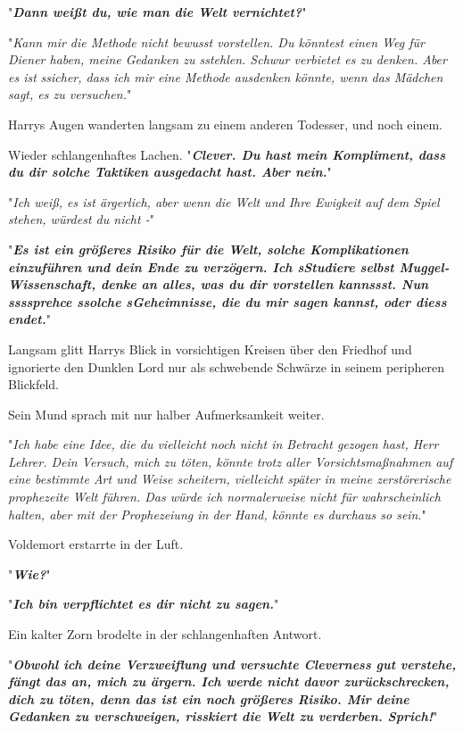 {"\textbf{\emph{Dann weißt du, wie man die Welt vernichtet?}}"

"\emph{Kann mir die Methode nicht bewusst vorstellen. Du könntest einen Weg für Diener haben, meine Gedanken zu sstehlen. Schwur verbietet es zu denken. Aber es ist} \emph{ssicher, dass ich mir eine Methode ausdenken könnte, wenn das Mädchen sagt, es zu versuchen.}"

Harrys Augen wanderten langsam zu einem anderen Todesser, und noch einem.

Wieder schlangenhaftes Lachen. "\textbf{\emph{Clever. Du hast mein Kompliment, dass du dir solche Taktiken ausgedacht hast. Aber nein.}}"

"\emph{Ich weiß, es ist ärgerlich, aber wenn die Welt und Ihre Ewigkeit auf dem Spiel stehen, würdest du nicht -}"

"\textbf{\emph{Es ist ein größeres Risiko für die Welt, solche Komplikationen einzuführen und dein Ende zu verzögern. Ich sStudiere selbst Muggel-Wissenschaft, denke an alles, was du dir vorstellen kannssst. Nun ssssprehce ssolche sGeheimnisse, die du mir sagen kannst, oder diess endet.}}"

Langsam glitt Harrys Blick in vorsichtigen Kreisen über den Friedhof und ignorierte den Dunklen Lord nur als schwebende Schwärze in seinem peripheren Blickfeld.

Sein Mund sprach mit nur halber Aufmerksamkeit weiter.

"\emph{Ich habe eine Idee, die du vielleicht noch nicht in Betracht gezogen hast, Herr Lehrer. Dein Versuch, mich zu töten, könnte trotz aller Vorsichtsmaßnahmen auf eine bestimmte Art und Weise scheitern, vielleicht später in meine zerstörerische prophezeite Welt führen. Das würde ich normalerweise nicht für wahrscheinlich halten, aber mit der Prophezeiung in der Hand, könnte es durchaus so sein}."

Voldemort erstarrte in der Luft.

"\textbf{\emph{Wie?}}"

"\textbf{\emph{Ich bin verpflichtet es dir nicht zu sagen.}}"

Ein kalter Zorn brodelte in der schlangenhaften Antwort.

"\textbf{\emph{Obwohl ich deine Verzweiflung und versuchte Cleverness gut verstehe, fängt das an, mich zu ärgern. Ich werde nicht davor zurückschrecken, dich zu töten, denn das ist ein noch größeres Risiko. Mir deine Gedanken zu verschweigen, risskiert die Welt zu verderben. Sprich!}}"

}
